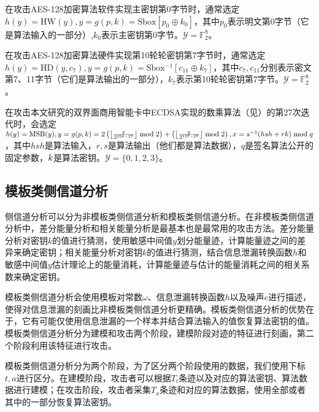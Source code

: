 {	\begin{example}\label{ex:aessw}
		在攻击AES-128加密算法软件实现主密钥第0字节时，通常选定$h(y)=\mathrm{HW}(y), y=g(p,k)=\mathrm{Sbox}[p_0\oplus k_0]$，其中$p_0$表示明文第0字节（它是算法输入的一部分）,$k_0$表示主密钥第0字节。$\mathcal Y=\mathbb F_2^8$。
	\end{example}

	\begin{example}
		在攻击AES-128加密算法硬件实现第10轮轮密钥第7字节时，通常选定$h(y)=\mathrm{HD}(y,c_7), y=g(p,k)=\mathrm{Sbox^{-1}}[c_{11}\oplus k_{7}]$，其中$c_7,c_{11}$分别表示密文第7、11字节（它们是算法输出的一部分），$k_7$表示第10轮轮密钥第7字节。$\mathcal Y=\mathbb F_2^8$。
	\end{example}

	\begin{example}\label{ex:ecdsa}
		在攻击本文研究的双界面商用智能卡中ECDSA实现的数乘算法（见）的第27次迭代时，会选定$h(y)=\mathrm{MSB}(y), y=g(p,k)=2\left( \left\lfloor \frac{x}{2^{256-27}}\right\rfloor \bmod 2\right)+\left( \left\lfloor \frac{x}{2^{127-27}}\right\rfloor\bmod 2\right),x=s^{-1}(hsh+rk)\bmod q $，其中$hsh$是算法输入，$r,s$是算法输出（他们都是算法数据），$q$是签名算法公开的固定参数，$k$是算法密钥。$\mathcal Y=\{0,1,2,3\}$。
	\end{example}
	\subsection{模板类侧信道分析}
	
	侧信道分析可以分为非模板类侧信道分析和模板类侧信道分析。在非模板类侧信道分析中，差分能量分析\citep{KocherJJ99, Messerges00, BevanK02}和相关能量分析\citep{Brier04}是最基本也是最常用的攻击方法。差分能量分析对密钥$k$的值进行猜测，使用敏感中间值$y$划分能量迹，计算能量迹之间的差异来确定密钥；相关能量分析对密钥$k$的值进行猜测，结合信息泄漏转换函数$h$和敏感中间值$y$估计理论上的能量消耗，计算能量迹与估计的能量消耗之间的相关系数来确定密钥。
	
	模板类侧信道分析会使用模板对常数$\omega$、信息泄漏转换函数$h$以及噪声$e$进行描述，使得对信息泄漏的刻画比非模板类侧信道分析更精确。模板类侧信道分析的优势在于，它有可能仅使用信息泄漏的一个样本并结合算法输入的值恢复算法密钥的值。模板类侧信道分析分为建模和攻击两个阶段，建模阶段对迹的特征进行刻画，第二个阶段利用该特征进行攻击\citep{Mangard07}。
	
	模板类侧信道分析分为两个阶段，为了区分两个阶段使用的数据，我们使用下标$t,a$进行区分。在建模阶段，攻击者可以根据$T_t$条迹以及对应的算法密钥、算法数据进行建模；在攻击阶段，攻击者采集$T_a$条迹和对应的算法数据，使用全部或者其中的一部分恢复算法密钥。
	
}
